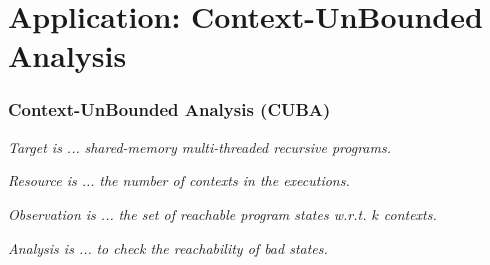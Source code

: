 \documentclass[aspectratio=169]{beamer}
\begin{document}
\section{Application: Context-UnBounded Analysis}
\begin{frame}
  \frametitle{Context-UnBounded Analysis (CUBA)}
  \begin{block}{\emph{Target is ...}}
    \vskip2pt
    \emph{shared-memory multi-threaded \alert{recursive} programs.}
    \centering
  \end{block}
  \begin{block}{\emph{Resource is ...}}
    \vskip2pt
    \emph{the number of \alert{contexts} in the executions.}
    \centering
  \end{block}
  \begin{block}{\emph{Observation is ...}}
    \vskip2pt
    \emph{the set of \alert{reachable} program states w.r.t. $k$ contexts.}
    \centering
  \end{block}
  \begin{block}{\emph{Analysis is ...}}
    \vskip2pt
    \emph{to check the reachability of \alert{bad} states.}
    \centering
  \end{block}
\end{frame}

\end{document}
